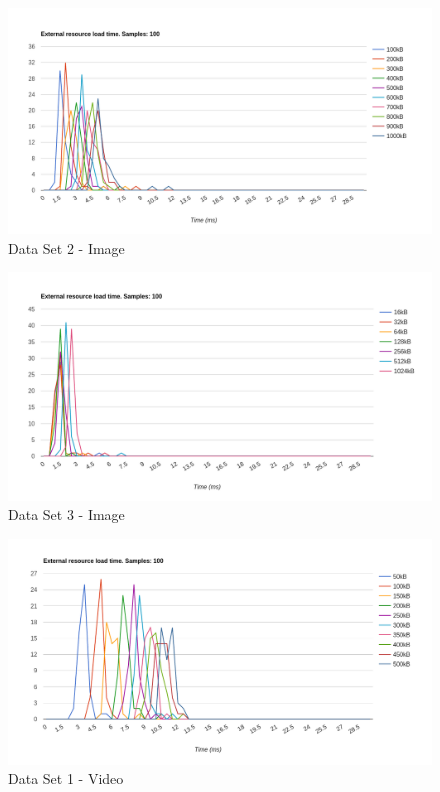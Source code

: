 \documentclass[10pt,a4paper,twoside]{book}
\begin{document}
\begin{figure}[h]
\centering
\includegraphics[width=\textwidth]{figures/i100L100.png}
\caption{Data Set 2 - Image}
\label{fig:videointerface}
\end{figure}

\begin{figure}[h]
\centering
\includegraphics[width=\textwidth]{figures/i100E.png}
\caption{Data Set 3 - Image}
\label{fig:videointerface}
\end{figure}

\begin{figure}[h]
\centering
\includegraphics[width=\textwidth]{figures/v100L50H.png}
\caption{Data Set 1 - Video}
\label{fig:videointerface}
\end{figure}
\end{document}

